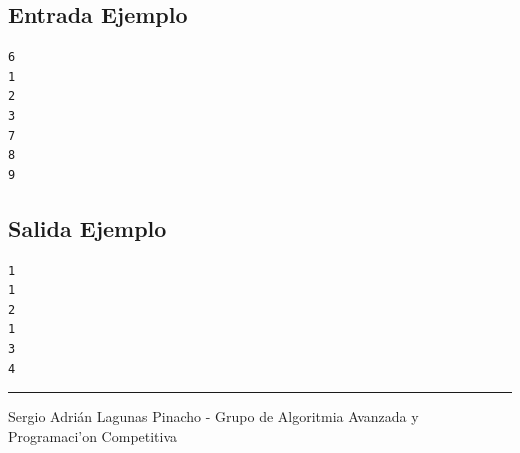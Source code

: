 \documentclass[letter,10pt]{article}
\newcommand{\lyxaddress}[1]{
\par {\raggedright #1
\vspace{1.4em}
\noindent\par}
}
\begin{document}
\newpage

$$$$$$$$$$$$$$$$



\subsection*{Entrada Ejemplo}
\begin{verbatim}
6
1
2
3
7
8
9

\end{verbatim}

\subsection*{Salida Ejemplo}

\begin{verbatim}
1
1
2
1
3
4

\end{verbatim}

\noindent \rule[0.5ex]{1\columnwidth}{1pt}


\lyxaddress{Sergio Adrián Lagunas Pinacho - Grupo de Algoritmia Avanzada y Programaci'on Competitiva}
\end{document}
